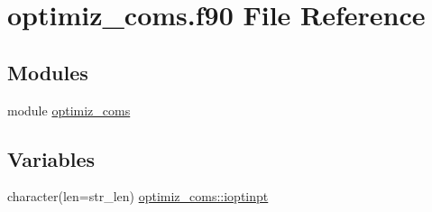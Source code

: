 \hypertarget{optimiz__coms_8f90}{}\section{optimiz\+\_\+coms.\+f90 File Reference}
\label{optimiz__coms_8f90}
\subsection*{Modules}
\begin{DoxyCompactItemize}
\item 
module \hyperlink{namespaceoptimiz__coms}{optimiz\+\_\+coms}
\end{DoxyCompactItemize}
\subsection*{Variables}
\begin{DoxyCompactItemize}
\item 
character(len=str\+\_\+len) \hyperlink{namespaceoptimiz__coms_a237b5bc7b92d46fc8943bc78fa9a3b5f}{optimiz\+\_\+coms\+::ioptinpt}
\end{DoxyCompactItemize}
